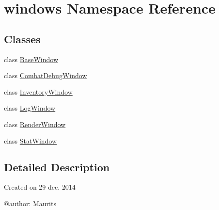 \hypertarget{namespacewindows}{}\section{windows Namespace Reference}
\label{namespacewindows}
\subsection*{Classes}
\begin{DoxyCompactItemize}
\item 
class \hyperlink{classwindows_1_1_base_window}{Base\+Window}
\item 
class \hyperlink{classwindows_1_1_combat_debug_window}{Combat\+Debug\+Window}
\item 
class \hyperlink{classwindows_1_1_inventory_window}{Inventory\+Window}
\item 
class \hyperlink{classwindows_1_1_log_window}{Log\+Window}
\item 
class \hyperlink{classwindows_1_1_render_window}{Render\+Window}
\item 
class \hyperlink{classwindows_1_1_stat_window}{Stat\+Window}
\end{DoxyCompactItemize}


\subsection{Detailed Description}
\begin{DoxyVerb}Created on 29 dec. 2014

@author: Maurits
\end{DoxyVerb}
 